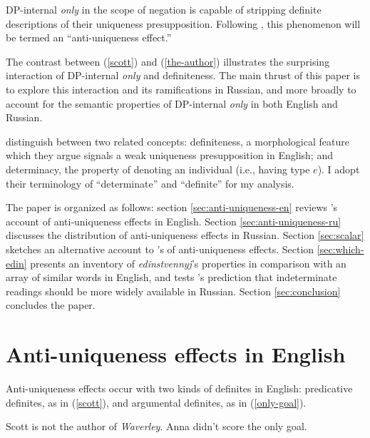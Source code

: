 \documentclass{article}
\begin{document}
DP-internal \textit{only} in the scope of negation is capable of stripping definite descriptions of their uniqueness presupposition. Following \citeauthor{cb2015}, this phenomenon will be termed an ``anti-uniqueness effect.''

The contrast between (\ref{scott}) and (\ref{the-author}) illustrates the surprising interaction of DP-internal \textit{only} and definiteness. The main thrust of this paper is to explore this interaction and its ramifications in Russian, and more broadly to account for the semantic properties of DP-internal \textit{only} in both English and Russian.

\citeauthor{cb2015} distinguish between two related concepts: definiteness, a morphological feature which they argue signals a weak uniqueness presupposition in English; and determinacy, the property of denoting an individual (i.e., having type $e$). I adopt their terminology of ``determinate'' and ``definite'' for my analysis.

The paper is organized as follows: section \ref{sec:anti-uniqueness-en} reviews \citeauthor{cb2015}'s account of anti-uniqueness effects in English. Section \ref{sec:anti-uniqueness-ru} discusses the distribution of anti-uniqueness effects in Russian. Section \ref{sec:scalar} sketches an alternative account to \citeauthor{cb2015}'s of anti-uniqueness effects. Section \ref{sec:which-edin} presents an inventory of \textit{edinstvennyj}'s properties in comparison with an array of similar words in English, and tests \citeauthor{cb2015}'s prediction that indeterminate readings should be more widely available in Russian. Section \ref{sec:conclusion} concludes the paper.




\section{Anti-uniqueness effects in English \label{sec:anti-uniqueness-en}}
Anti-uniqueness effects occur with two kinds of definites in English: predicative definites, as in (\ref{scott}), and argumental definites, as in (\ref{only-goal}).

\begin{exe}
	 Scott is not the author of \textit{Waverley}.
	\ex \label{only-goal} Anna didn't score the only goal.
\end{exe}
\end{document}
